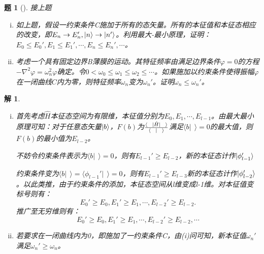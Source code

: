 \documentclass[UTF8,10pt,a4paper]{article}
\theoremstyle{Problem}%
\newtheorem{prob}{题}%
\theoremstyle{Solution}%
\newtheorem*{sol}{解}%
\begin{document}
\begin{prob}[]接上题
    \vspace{-0.5em}
    \begin{enumerate}[(i)]
        \item 如上题，假设一约束条件C施加于所有的态矢量。所有的本征值和本征态相应的改变，即$E_n\to E_n', \ket{n} \to \ket{n'}$。利用最大-最小原理，证明：$E_0 \leq E_0', E_1 \leq E_1', \cdots, E_n \leq E_n', \cdots$。
        \item 考虑一个具有固定边界B薄膜的运动。其特征频率由满足边界条件$\varphi = 0$的方程$-\nabla^2\varphi = \omega_n^2\varphi$确定。令$0 < \omega_0 \leq \omega_1 \leq \omega_2 \leq \cdots$。如果施加以约束条件使得振幅$\varphi$在一闭曲线$C$内为零，则特征频率$\omega_n$变为$\omega_n'$。证明$\omega_n \leq \omega_n'$。
    \end{enumerate}
\end{prob}
\begin{sol}
\begin{enumerate}[(i)]
    \item 首先考虑$\hat{H}$本征态空间为有限维，本征值分别为$E_0,E_1, \cdots, E_{l-1}$。由最大最小原理可知：对于任意态矢量$\ket{b}$，$F(b)$为$\frac{\bra{~~} \hat{H} \ket{~~}}{\langle ~~ \vert ~~ \rangle}$满足$\langle b \vert ~~ \rangle = 0$的最大值，则$F(b)$的最小值为$E_{l-2}$。 
    
    不妨令约束条件表示为$\langle b \vert ~~ \rangle = 0$，则有$E_{l-1}' \geq E_{l-2}$，新的本征态计作$\ket{\phi_{l-1}'}$

    约束条件变为$\langle b \vert ~~ \rangle = \langle \phi_{l-1}' \vert ~~ \rangle = 0$，则有$E_{l-1}' \geq E_{l-3}$新的本征态计作$\ket{\phi_{l-2}'}$。以此类推，由于约束条件的添加，本征态空间从l维变成l-1维。对本征值变标号则有：
    \[
        E_0'\geq E_0, E_1' \geq E_1, \cdots, E_{l-2}' \geq E_{l-2}.
    \]
    推广至无穷维则有：
    \[
        E_0'\geq E_0, E_1' \geq E_1, \cdots, E_{l-2}' \geq E_{l-2},\cdots
    \]

    \item 若要求在一闭曲线内为0，即施加了一约束条件C，由(i)问可知，新本征值$\omega_n'$满足$\omega_n'\geq \omega_n$。
\end{enumerate}
\end{sol}
\end{document}
